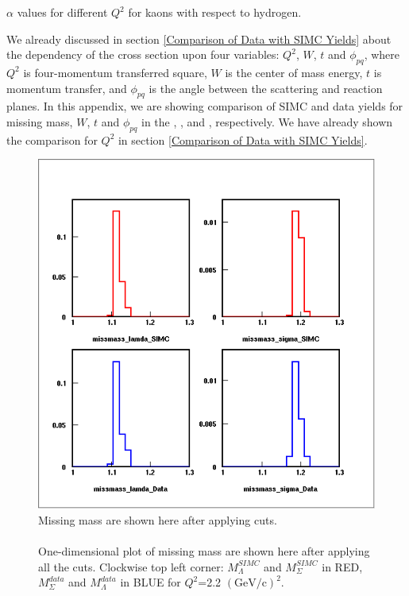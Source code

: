 \begin{table}
  \caption{$\alpha$ values for different $Q^2$ for kaons with respect to hydrogen.}
  \label{tab:alpha1}

\end{table}
\newpage
{}
We already discussed in section \ref{Comparison of Data with SIMC Yields} about the dependency of the cross section upon four variables: $Q^2$, $W$, $t$ and $\phi_{pq}$, where $Q^2$ is four-momentum transferred square, $W$ is the center of mass energy, $t$ is momentum transfer, and $\phi_{pq}$ is  the angle between the scattering and reaction planes. In this appendix, we are showing comparison of SIMC and data yields for missing mass, $W$, $t$ and $\phi_{pq}$ in the , ,  and , respectively. We have already shown the comparison for $Q^2$ in section \ref{Comparison of Data with SIMC Yields}.

\begin{figure}[!tbp]
  \centering
  \includegraphics[width=0.8\columnwidth]{missmass2}
  \caption[Missing mass are shown here after applying cuts.]{\label{fig:missmass2}Missing mass are shown here after applying cuts.\\\\ One-dimensional plot of missing mass are shown here after applying all the cuts. Clockwise top left corner: $M_\Lambda^{SIMC}$ and $M_\Sigma^{SIMC}$ in RED, $M_\Sigma^{data}$ and $M_\Lambda^{data}$ in BLUE for $Q^2$=2.2 $(\mathrm{GeV/c})^2$.}
\end{figure}

